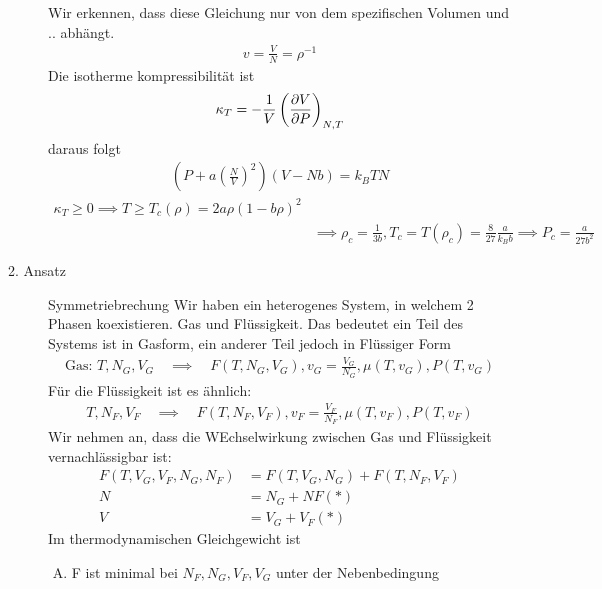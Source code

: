 \begin{description}
    Wir erkennen, dass diese Gleichung nur von dem spezifischen Volumen und ..
    abh\"angt.
    \begin{align*}
      v = \frac{V}{N} = \rho^{-1}
    \end{align*}
    Die isotherme kompressibilit\"at ist
    \begin{align*}
      \kappa_T = - \frac{1}{V} \left( \frac{\partial V }{\partial P} \right)_{N,T}
    \end{align*}
    daraus folgt
    \begin{align*}
      \left( P+ a \left(\frac{N}{V}\right)^2\right) (V - N b) = k_B T N 
    \end{align*}
    \begin{align*}
      \kappa_T \ge 0 \implies T \ge T_c (\rho) = 2 a \rho (1- b\rho)^2 \\
      & \implies \rho_c = \frac{1}{3b}, T_c = T(\rho_c) = \frac{8}{27} 
      \frac{a}{k_B b} \implies P_c = \frac{a}{27 b^2} 
    \end{align*}
  \item[2. Ansatz] Symmetriebrechung
    Wir haben ein heterogenes System, in welchem 2 Phasen koexistieren.
    Gas und Fl\"ussigkeit. Das bedeutet ein Teil des Systems ist in 
    Gasform, ein anderer Teil jedoch in Fl\"ussiger Form
    \begin{align*}
      \text{Gas: } T, N_G, V_G \quad \implies \quad F (T, N_G, V_G) ,
      v_G = \frac{V_G}{N_G}, \mu(T, v_G), P(T, v_G)
    \end{align*}
    F\"ur die Fl\"ussigkeit ist es \"ahnlich:
    \begin{align*}
      T, N_F, V_F \quad \implies \quad F(T, N_F, V_F), v_F = \frac{V_F}{N_F}, 
      \mu(T, v_F) , P(T, v_F)
    \end{align*}
    Wir nehmen an, dass die WEchselwirkung zwischen Gas und Fl\"ussigkeit
    vernachl\"assigbar ist:
    \begin{align*}
      F(T, V_G, V_F, N_G, N_F) &= F(T, V_G, N_G) + F(T, N_F, V_F) \\
      N & = N_G + NF (*)\\
      V &= V_G + V_F (*)
    \end{align*}
    Im thermodynamischen Gleichgewicht ist
    \begin{enumerate}[A)]
      \item F ist minimal bei $N_F, N_G, V_F, V_G$ unter der Nebenbedingung

\end{enumerate}
\end{description}
